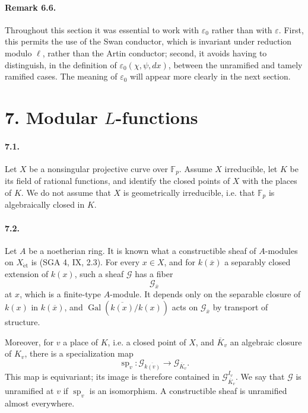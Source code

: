 \documentclass[10pt]{article}
\newcommand{\F}{\mathbb F}
\newcommand{\Gal}{\operatorname{Gal}}
\providecommand{\spc}{\operatorname{sp}}
\providecommand{\Gal}{\operatorname{Gal}}
\providecommand{\spc}{\operatorname{sp}}
\providecommand{\Gal}{\operatorname{Gal}}
\providecommand{\Gal}{\operatorname{Gal}}
\providecommand{\spc}{\operatorname{sp}}
\providecommand{\Gal}{\operatorname{Gal}}
\begin{document}
\paragraph{Remark 6.6.} Throughout this section it was essential to work with \(\varepsilon_0\) rather than with \(\varepsilon\). First, this permits the use of the Swan conductor, which is invariant under reduction modulo \(\ell\), rather than the Artin conductor; second, it avoids having to distinguish, in the definition of \(\varepsilon_0(\chi,\psi,dx)\), between the unramified and tamely ramified cases. The meaning of \(\varepsilon_0\) will appear more clearly in the next section.

\section*{7. Modular \(L\)-functions}

\paragraph{7.1.} Let \(X\) be a nonsingular projective curve over \(\F_p\). Assume \(X\) irreducible, let \(K\) be its field of rational functions, and identify the closed points of \(X\) with the places of \(K\). We do not assume that \(X\) is geometrically irreducible, i.e. that \(\F_p\) is algebraically closed in \(K\).

\paragraph{7.2.} Let \(A\) be a noetherian ring. It is known what a constructible sheaf of \(A\)-modules on \(X_{\mathrm{\acute et}}\) is (SGA 4, IX, 2.3). For every \(x\in X\), and for \(k(\overline x)\) a separably closed extension of \(k(x)\), such a sheaf \(\mathcal G\) has a fiber
\[
\mathcal G_{\overline x}
\]
at \(x\), which is a finite-type \(A\)-module. It depends only on the separable closure of \(k(x)\) in \(k(\overline x)\), and \(\Gal(\overline{k(x)}/k(x))\) acts on \(\mathcal G_{\overline x}\) by transport of structure.

Moreover, for \(v\) a place of \(K\), i.e. a closed point of \(X\), and \(\overline K_v\) an algebraic closure of \(K_v\), there is a specialization map
\[
\spc_v:\mathcal G_{\overline{k(v)}}\longrightarrow \mathcal G_{\overline K_v}.
\]
This map is equivariant; its image is therefore contained in \(\mathcal G_{\overline K_v}^{I_v}\). We say that \(\mathcal G\) is unramified at \(v\) if \(\spc_v\) is an isomorphism. A constructible sheaf is unramified almost everywhere.
\end{document}
